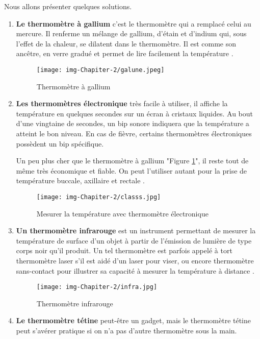 \documentclass[12pt]{article}
\begin{document}
Nous allons présenter quelques solutions.
\begin{enumerate}
	\item \textbf{Le thermomètre à gallium} c’est le thermomètre qui a remplacé celui au mercure. Il renferme un mélange de gallium, d’étain et d’indium qui, sous l’effet de la chaleur, se dilatent dans le thermomètre. Il est comme son ancêtre, en verre gradué et permet de lire facilement la température \cite{36}.
	\begin{figure}[h]
		\centering
		\texttt{[image: img-Chapiter-2/galune.jpeg]}
		\caption{Thermomètre à gallium}
		\label{fig:gallium}
	\end{figure}
	
	\item \textbf{Les thermomètres électronique} très facile à utiliser, il affiche la température en quelques secondes sur un écran à cristaux liquides. Au bout d’une vingtaine de secondes, un bip sonore indiquera que la température a atteint le bon niveau. En cas de fièvre, certains thermomètres électroniques possèdent un bip spécifique. 
	
Un peu plus cher que le thermomètre à gallium "Figure \ref{fig:gallium}", il reste tout de même très économique et fiable. On peut l’utiliser autant pour la prise de température buccale, axillaire et rectale \cite{36}.

\newpage
\begin{figure}[h]
	\centering
	\texttt{[image: img-Chapiter-2/classs.jpg]}
	\caption{Mesurer la température avec thermomètre électronique}
\end{figure}

	\item \textbf{Un thermomètre infrarouge} est un instrument permettant de mesurer la température de surface d'un objet à partir de l'émission de lumière de type corps noir qu'il produit. Un tel thermomètre est parfois appelé à tort thermomètre laser s'il est aidé d'un laser pour viser, ou encore thermomètre sans-contact pour illustrer sa capacité à mesurer la température à distance \cite{37}.
	\begin{figure}[h]
		\centering
		\texttt{[image: img-Chapiter-2/infra.jpg]}
		\caption{Thermomètre infrarouge}
	\end{figure}
	
	\newpage
	\item \textbf{Le thermomètre tétine } peut-être un gadget, mais le thermomètre tétine peut s’avérer pratique si on n’a pas d’autre thermomètre sous la main. 


\end{enumerate}
\end{document}
